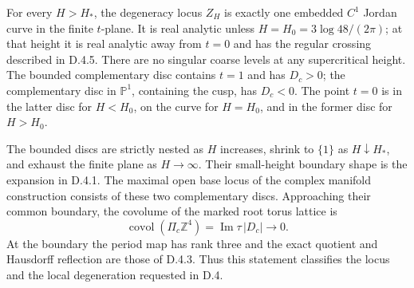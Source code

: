 \begin{proposition}[D.4.8; Proved]
For every \(H>H_*\), the degeneracy locus \(Z_H\) is exactly one
embedded \(C^1\) Jordan curve in the finite \(t\)-plane. It is
real analytic unless \(H=H_0=3\log48/(2\pi)\); at that height it
is real analytic away from \(t=0\) and has the regular crossing
described in D.4.5. There are no singular coarse levels at any
supercritical height. The bounded complementary disc contains
\(t=1\) and has \(D_c>0\); the complementary disc in
\(\mathbb P^1\), containing the cusp, has \(D_c<0\). The point
\(t=0\) is in the latter disc for \(H<H_0\), on the curve for
\(H=H_0\), and in the former disc for \(H>H_0\).

The bounded discs are strictly nested as \(H\) increases, shrink
to \(\{1\}\) as \(H\downarrow H_*\), and exhaust the finite
plane as \(H\to\infty\). Their small-height boundary shape is
the expansion in D.4.1. The maximal open base locus of the complex
manifold construction consists of these two complementary discs.
Approaching their common boundary, the covolume of the marked
root torus lattice is
\[
 \operatorname{covol}(\Pi_c\mathbb Z^4)
       =\operatorname{Im}\tau\,|D_c|\longrightarrow0.
\]
At the boundary the period map has rank three and the exact quotient
and Hausdorff reflection are those of D.4.3. Thus this statement
classifies the locus and the local degeneration requested in D.4.
\end{proposition}
